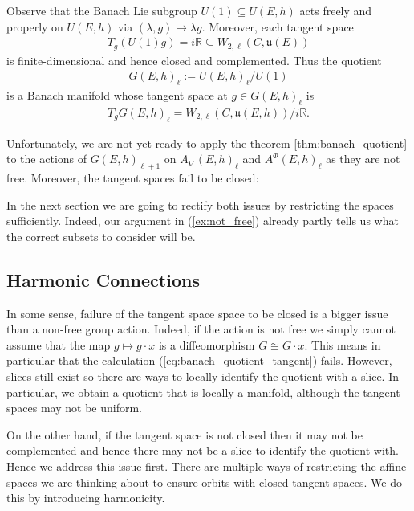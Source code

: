 \documentclass[12pt]{ociamthesis}  %
\begin{document}
\begin{example}
  Observe that the Banach Lie subgroup $U(1)\subseteq U(E,h)$ acts freely and properly
  on $U(E,h)$ via $(\lambda,g)\mapsto \lambda g$. Moreover, each tangent space
  \begin{align*}
    T_g(U(1)g) =
    i\mathbb{R} \subseteq W_{2,\ell}(C,\mathfrak u(E))
  \end{align*}
  is finite-dimensional and hence closed and complemented.  Thus the quotient
  \begin{align*}
    G(E,h)_{\ell} := U(E,h)_\ell / U(1)
  \end{align*}
  is a Banach manifold whose tangent space at $g\in G(E,h)_\ell$ is
  \begin{align*}
    T_g G(E,h)_\ell = W_{2,\ell}(C,\mathfrak u(E,h))/i\mathbb{R}.
  \end{align*}
\end{example}

Unfortunately, we are not yet ready to apply the theorem \ref{thm:banach_quotient} to
the actions of $G(E,h)_{\ell+1}$ on $A_\nabla(E,h)_\ell$ and
$A^\Phi(E,h)_\ell$ as they are not free. Moreover, the tangent spaces fail to
be closed:

\begin{example}
  \missingexample
\end{example}

In the next section we are going to rectify both issues by restricting the spaces
sufficiently. Indeed, our argument in (\ref{ex:not_free}) already partly tells us
what the correct subsets to consider will be.

\subsection{Harmonic Connections}

In some sense, failure of the tangent space space to be closed is a bigger issue than
a non-free group action. Indeed, if the action is not free we simply cannot assume that
the map $g\mapsto g\cdot x$ is a diffeomorphism $G\cong G\cdot x$. This means in particular
that the calculation
(\ref{eq:banach_quotient_tangent}) fails. However, slices still exist so there are ways to
locally identify the quotient with a slice. In particular, we obtain a quotient that is
locally a manifold, although the tangent spaces may not be uniform.

On the other hand, if the tangent space is not closed then it may not be complemented and
hence there may not be a slice to identify the quotient with. Hence we address this issue first.
There are multiple ways of restricting the affine spaces we are thinking about to
ensure orbits with closed tangent spaces. We do this by introducing harmonicity.
\end{document}

